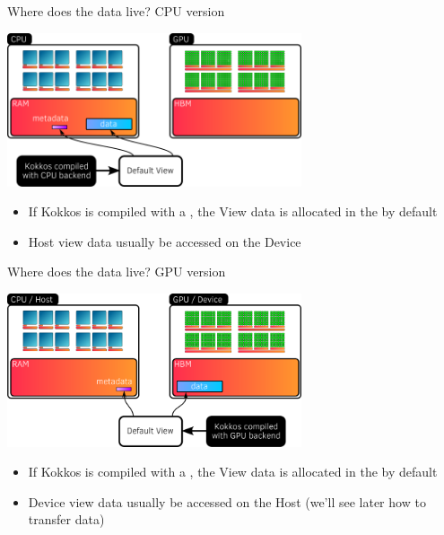 \documentclass[aspectratio=169]{beamer}
\begin{document}

\begin{frame}{Where does the data live? CPU version}
    \begin{center}
        \includegraphics[width=0.65\textwidth]{host_view_memory.png}
    \end{center}
    \begin{itemize}
        \item If Kokkos is compiled with a , the View data is allocated in the  by default
        \item Host view data usually  be accessed on the Device
    \end{itemize}
\end{frame}


\begin{frame}{Where does the data live? GPU version}
    \begin{center}
        \includegraphics[width=0.65\textwidth]{device_view_memory.png}
    \end{center}
    \begin{itemize}
        \item If Kokkos is compiled with a , the View data is allocated in the  by default
        \item Device view data usually  be accessed on the Host (we'll see later how to transfer data)
    \end{itemize}
\end{frame}
\end{document}
